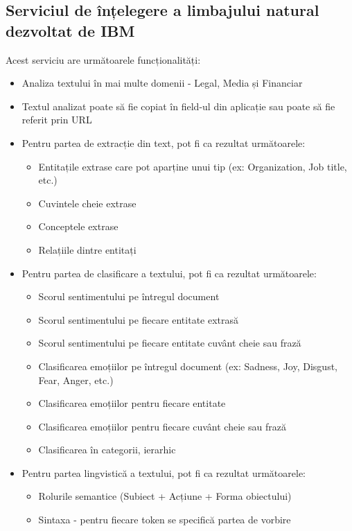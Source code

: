 \subsection{Serviciul de înțelegere a limbajului natural dezvoltat de IBM}
{\noindent Acest serviciu are următoarele funcționalități:}
\begin{itemize}
    \setlength\itemsep{0.5em}
    \item Analiza textului în mai multe domenii - Legal, Media și Financiar
    \item Textul analizat poate să fie copiat în field-ul din aplicație sau poate să fie referit prin URL
    \item Pentru partea de extracție din text, pot fi ca rezultat următoarele:
    \begin{itemize}
        \setlength\itemsep{0.5em}
        \item Entitațile extrase care pot aparține unui tip (ex: Organization, Job title, etc.)
        \item Cuvintele cheie extrase
        \item Conceptele extrase
        \item Relațiile dintre entitați
    \end{itemize}
    \item Pentru partea de clasificare a textului, pot fi ca rezultat următoarele:
    \begin{itemize}
        \setlength\itemsep{0.5em}
        \item Scorul sentimentului pe întregul document
        \item Scorul sentimentului pe fiecare entitate extrasă 
        \item Scorul sentimentului pe fiecare entitate cuvânt cheie sau frază 
        \item Clasificarea emoțiilor pe întregul document (ex: Sadness, Joy, Disgust, Fear, Anger, etc.)
        \item Clasificarea emoțiilor pentru fiecare entitate
        \item Clasificarea emoțiilor pentru fiecare cuvânt cheie sau frază
        \item Clasificarea în categorii, ierarhic
    \end{itemize}
    \item Pentru partea lingvistică a textului, pot fi ca rezultat următoarele:
    \begin{itemize}
        \setlength\itemsep{0.5em}
        \item Rolurile semantice (Subiect + Acțiune + Forma obiectului)
        \item Sintaxa - pentru fiecare token se specifică partea de vorbire
    \end{itemize}
\end{itemize}
